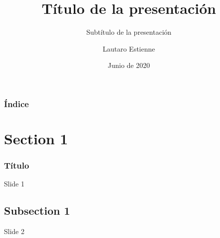 \documentclass{beamer}
\title{Título de la presentación}
\subtitle{Subtítulo de la presentación}
\author{Lautaro Estienne}
\institute{Facultad de Ingeniería de la Universidad de Buenos Aires}
\date{Junio de 2020}
\begin{document}
\begin{frame}
\titlepage
\end{frame}

\begin{frame}
\frametitle{Índice}
\tableofcontents
\end{frame}

\section{Section 1}
\begin{frame}
\frametitle{Título}
Slide 1
\end{frame}

\subsection{Subsection 1}
\begin{frame}
Slide 2
\end{frame}

\begin{frame}
\end{frame}
\end{document}
